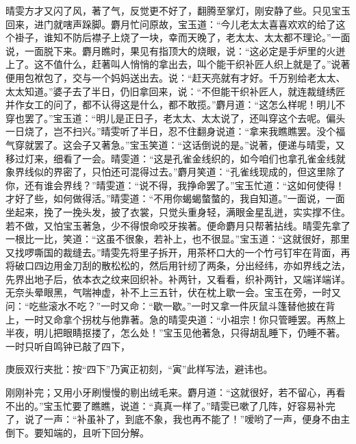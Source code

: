 \begin{parag}
    晴雯方才又闪了风，著了气，反觉更不好了，翻腾至掌灯，刚安静了些。只见宝玉回来，进门就嗐声跺脚。麝月忙问原故，宝玉道：“今儿老太太喜喜欢欢的给了这个褂子，谁知不防后襟子上烧了一块，幸而天晚了，老太太、太太都不理论。”一面说，一面脱下来。麝月瞧时，果见有指顶大的烧眼，说：“这必定是手炉里的火迸上了。这不值什么，赶著叫人悄悄的拿出去，叫个能干织补匠人织上就是了。”说著便用包袱包了，交与一个妈妈送出去。说：“赶天亮就有才好。千万别给老太太、太太知道。”婆子去了半日，仍旧拿回来，说：“不但能干织补匠人，就连裁缝绣匠并作女工的问了，都不认得这是什么，都不敢揽。”麝月道：“这怎么样呢！明儿不穿也罢了。”宝玉道：“明儿是正日子，老太太、太太说了，还叫穿这个去呢。偏头一日烧了，岂不扫兴。”晴雯听了半日，忍不住翻身说道：“拿来我瞧瞧罢。没个福气穿就罢了。这会子又著急。”宝玉笑道：“这话倒说的是。”说著，便递与晴雯，又移过灯来，细看了一会。晴雯道：“这是孔雀金线织的，如今咱们也拿孔雀金线就象界线似的界密了，只怕还可混得过去。”麝月笑道：“孔雀线现成的，但这里除了你，还有谁会界线？”晴雯道：“说不得，我挣命罢了。”宝玉忙道：“这如何使得！才好了些，如何做得活。”晴雯道：“不用你蝎蝎螫螫的，我自知道。”一面说，一面坐起来，挽了一挽头发，披了衣裳，只觉头重身轻，满眼金星乱迸，实实撑不住。若不做，又怕宝玉著急，少不得恨命咬牙挨著。便命麝月只帮著拈线。晴雯先拿了一根比一比，笑道：“这虽不很象，若补上，也不很显。”宝玉道：“这就很好，那里又找啰嘶国的裁缝去。”晴雯先将里子拆开，用茶杯口大的一个竹弓钉牢在背面，再将破口四边用金刀刮的散松松的，然后用针纫了两条，分出经纬，亦如界线之法，先界出地子后，依本衣之纹来回织补。补两针，又看看，织补两针，又端详端详。无奈头晕眼黑，气喘神虚，补不上三五针，伏在枕上歇一会。宝玉在旁，一时又问：“吃些滚水不吃？”一时又命：“歇一歇。”一时又拿一件灰鼠斗篷替他披在背上，一时又命拿个拐枕与他靠著。急的晴雯央道：“小祖宗！你只管睡罢。再熬上半夜，明儿把眼睛抠搂了，怎么处！”宝玉见他著急，只得胡乱睡下，仍睡不著。一时只听自鸣钟已敲了四下，\begin{note}庚辰双行夹批：按“四下”乃寅正初刻，“寅”此样写法，避讳也。\end{note}刚刚补完；又用小牙刷慢慢的剔出绒毛来。麝月道：“这就很好，若不留心，再看不出的。”宝玉忙要了瞧瞧，说道：“真真一样了。”晴雯已嗽了几阵，好容易补完了，说了一声：“补虽补了，到底不象，我也再不能了！”嗳哟了一声，便身不由主倒下。要知端的，且听下回分解。
\end{parag}
